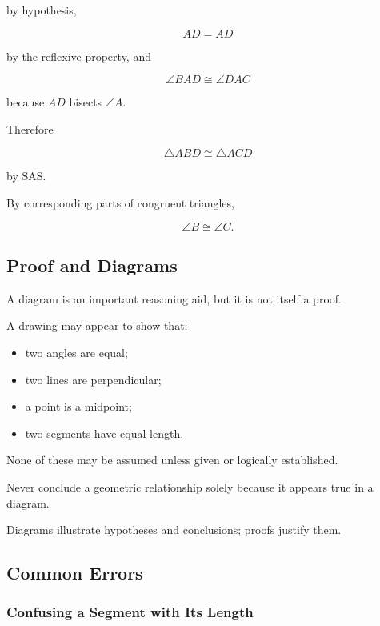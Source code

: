 by hypothesis,

\[ AD=AD \]

by the reflexive property, and

\[ \angle BAD\cong\angle DAC \]

because \(AD\) bisects \(\angle A\).

Therefore

\[ \triangle ABD\cong\triangle ACD \]

by SAS.

By corresponding parts of congruent triangles,

\[ \boxed{\angle B\cong\angle C.} \]

\subsection{Proof and Diagrams}
\label{subsec:proof-and-diagrams}

A diagram is an important reasoning aid, but it is not itself a proof.

A drawing may appear to show that:

\begin{itemize}
    \item two angles are equal;
    \item two lines are perpendicular;
    \item a point is a midpoint;
    \item two segments have equal length.
\end{itemize}

None of these may be assumed unless given or logically established.

\begin{warningbox}
Never conclude a geometric relationship solely because it appears true in a
diagram.

Diagrams illustrate hypotheses and conclusions; proofs justify them.
\end{warningbox}

\subsection{Common Errors}
\label{subsec:euclidean-geometry-common-errors}

\subsubsection{Confusing a Segment with Its Length}

